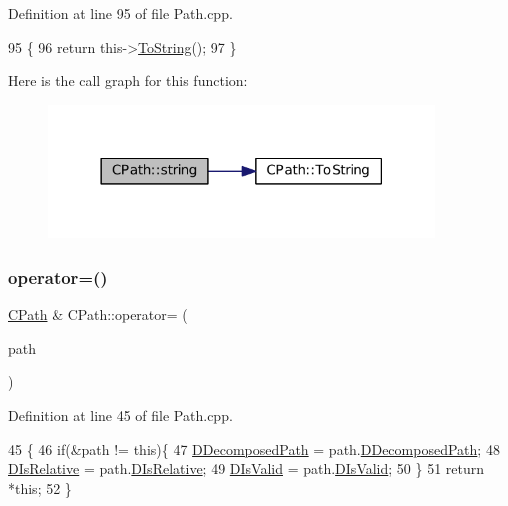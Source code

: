 Definition at line 95 of file Path.\+cpp.


\begin{DoxyCode}
95                                \{
96     \textcolor{keywordflow}{return} this->\hyperlink{classCPath_abbafaf377a7e38e0151bd9567d526951}{ToString}();
97 \}
\end{DoxyCode}
Here is the call graph for this function\+:\nopagebreak
\begin{figure}[H]
\begin{center}
\leavevmode
\includegraphics[width=290pt]{classCPath_a8fade0e7a418c92d5f68ac8872dda8b1_cgraph}
\end{center}
\end{figure}
\hypertarget{classCPath_a6f3121638129c293fca7bbeecd8b0ad3}{}\label{classCPath_a6f3121638129c293fca7bbeecd8b0ad3} 
\subsubsection{\texorpdfstring{operator=()}{operator=()}}
{\footnotesize\ttfamily \hyperlink{classCPath}{C\+Path} \& C\+Path\+::operator= (\begin{DoxyParamCaption}\item[{const \hyperlink{classCPath}{C\+Path} \&}]{path }\end{DoxyParamCaption})}



Definition at line 45 of file Path.\+cpp.


\begin{DoxyCode}
45                                         \{
46     \textcolor{keywordflow}{if}(&path != \textcolor{keyword}{this})\{
47         \hyperlink{classCPath_a03ed25209a01e633c107a0c877fc61f8}{DDecomposedPath} = path.\hyperlink{classCPath_a03ed25209a01e633c107a0c877fc61f8}{DDecomposedPath};
48         \hyperlink{classCPath_af705ff149bb2281c67afb84fff550eb9}{DIsRelative} = path.\hyperlink{classCPath_af705ff149bb2281c67afb84fff550eb9}{DIsRelative};
49         \hyperlink{classCPath_a992aca27a1cba1c3bae3d04438821192}{DIsValid} = path.\hyperlink{classCPath_a992aca27a1cba1c3bae3d04438821192}{DIsValid};
50     \}
51     \textcolor{keywordflow}{return} *\textcolor{keyword}{this};
52 \}
\end{DoxyCode}
\hypertarget{classCPath_aaf49ee9d0f8ed1ffa6bb5e18aba86b4f}{}\label{classCPath_aaf49ee9d0f8ed1ffa6bb5e18aba86b4f} 
